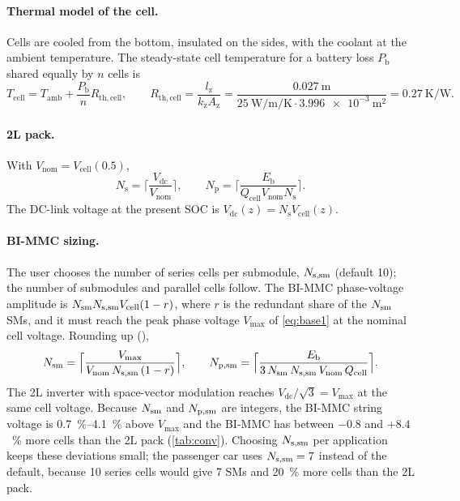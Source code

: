 \paragraph{Thermal model of the cell.} Cells are cooled from the bottom, insulated on the sides, with the coolant at the ambient temperature. The steady-state cell temperature for a battery loss $P_\mathrm{b}$ shared equally by $n$ cells is
\begin{equation}
T_\mathrm{cell}=T_\mathrm{amb}+\frac{P_\mathrm{b}}{n}R_\mathrm{th,cell},\qquad R_\mathrm{th,cell}=\frac{l_\mathrm{z}}{k_\mathrm{z}A_\mathrm{z}}=\frac{\SI{0.027}{\metre}}{\SI{25}{\watt\per\metre\per\kelvin}\cdot\SI{3.996e-3}{\metre\squared}}=\SI{0.27}{\kelvin\per\watt}.
\label{eq:tcell}
\end{equation}

\paragraph{2L pack.} With $V_\mathrm{nom}=V_\mathrm{cell}(0.5)$,
\begin{equation}
N_\mathrm{s}=\Big\lceil\frac{V_\mathrm{dc}}{V_\mathrm{nom}}\Big\rceil,\qquad N_\mathrm{p}=\Big\lceil\frac{E_\mathrm{b}}{Q_\mathrm{cell}V_\mathrm{nom}N_\mathrm{s}}\Big\rceil.
\label{eq:pack2l}
\end{equation}
The DC-link voltage at the present SOC is $V_\mathrm{dc}(z)=N_\mathrm{s}V_\mathrm{cell}(z)$.

\paragraph{BI-MMC sizing.} The user chooses the number of series cells per submodule, $N_\mathrm{s,sm}$ (default 10); the number of submodules and parallel cells follow. The BI-MMC phase-voltage amplitude is $N_\mathrm{sm}N_\mathrm{s,sm} V_\mathrm{cell}(1-r)$, where $r$ is the redundant share of the $N_\mathrm{sm}$ SMs, and it must reach the peak phase voltage $V_\mathrm{max}$ of \cref{eq:base1} at the nominal cell voltage. Rounding up (),
\begin{equation}
N_\mathrm{sm}=\Big\lceil\frac{V_\mathrm{max}}{V_\mathrm{nom}\,N_\mathrm{s,sm}\,(1-r)}\Big\rceil,\qquad
N_\mathrm{p,sm}=\Big\lceil\frac{E_\mathrm{b}}{3\,N_\mathrm{sm}\,N_\mathrm{s,sm}\,V_\mathrm{nom}\,Q_\mathrm{cell}}\Big\rceil.
\label{eq:npsm}
\end{equation}
The 2L inverter with space-vector modulation reaches $V_\mathrm{dc}/\sqrt3=V_\mathrm{max}$ at the same cell voltage. Because $N_\mathrm{sm}$ and $N_\mathrm{p,sm}$ are integers, the BI-MMC string voltage is \SIrange{0.7}{4.1}{\percent} above $V_\mathrm{max}$ and the BI-MMC has between $-0.8$ and $+8.4$~\% more cells than the 2L pack (\cref{tab:conv}). Choosing $N_\mathrm{s,sm}$ per application keeps these deviations small; the passenger car uses $N_\mathrm{s,sm}=7$ instead of the default, because 10 series cells would give 7 SMs and \SI{20}{\percent} more cells than the 2L pack.

